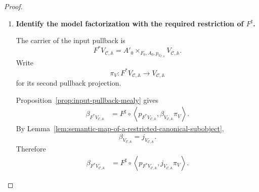 \begin{proof}
\begin{enumerate}
        Since
        \[
            V_{\mathcal C,\mathbb A}
            \in
            \mathcal C_{\mathbb A}
        \]
        and the family \(\mathcal C\) is closed under input pullback,
        \[
            F^*V_{\mathcal C,\mathbb A}
            \in
            \mathcal C_{\mathbb A'}.
        \]
        Using
        \[
            \mathcal C_{\mathbb A'}
            =
            \mathsf{Mod}(V_{\mathcal C,\mathbb A'}),
        \]
        the object \(F^*V_{\mathcal C,\mathbb A}\) models
        \(V_{\mathcal C,\mathbb A'}\). Hence there is a unique factorization
        \[
            \varphi_F:
            F^*V_{\mathcal C,\mathbb A}
            \longrightarrow
            V_{\mathcal C,\mathbb A'}
        \]
        satisfying
        \[
            j_{V_{\mathcal C,\mathbb A'}}
            \varphi_F
            =
            \beta_{F^*V_{\mathcal C,\mathbb A}}.
        \]
        By Lemma~\ref{lem:model-factorizations-strict},
        \(\varphi_F\) is a strict semantic homomorphism.

        \item \textbf{Identify the model factorization with the required
        restriction of \(F^\sharp\).}

        The carrier of the input pullback is
        \[
            F^*V_{\mathcal C,\mathbb A}
            =
            A'_0
            \times_{F_0,A_0,p_{V_{\mathcal C,\mathbb A}}}
            V_{\mathcal C,\mathbb A}.
        \]
        Write
        \[
            \pi_V:
            F^*V_{\mathcal C,\mathbb A}
            \to
            V_{\mathcal C,\mathbb A}
        \]
        for its second pullback projection.

        Proposition~\ref{prop:input-pullback-mealy} gives
        \[
        \begin{aligned}
            \beta_{F^*V_{\mathcal C,\mathbb A}}
            &=
            F^\sharp
            \circ
            \left\langle
                p_{F^*V_{\mathcal C,\mathbb A}},
                \beta_{V_{\mathcal C,\mathbb A}}\pi_V
            \right\rangle.
        \end{aligned}
        \]
        By
        Lemma~\ref{lem:semantic-map-of-a-restricted-canonical-subobject},
        \[
            \beta_{V_{\mathcal C,\mathbb A}}
            =
            j_{V_{\mathcal C,\mathbb A}}.
        \]
        Therefore
        \[
        \begin{aligned}
            \beta_{F^*V_{\mathcal C,\mathbb A}}
            &=
            F^\sharp
            \circ
            \left\langle
                p_{F^*V_{\mathcal C,\mathbb A}},
                j_{V_{\mathcal C,\mathbb A}}\pi_V
            \right\rangle.
        \end{aligned}
        \]


\end{enumerate}
\end{proof}
